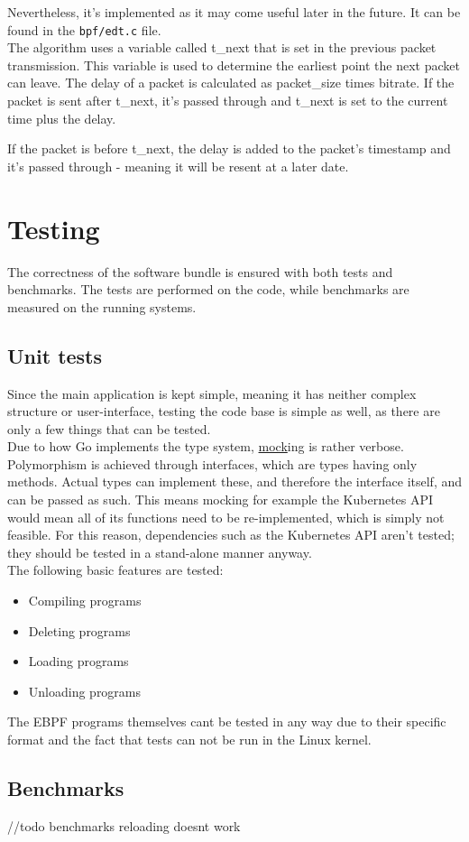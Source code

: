 Nevertheless, it's implemented as it may come useful later in the future. It can be found in the \texttt{bpf/edt.c} file. \\

The algorithm uses a variable called t\_next that is set in the previous packet transmission. This variable is used to determine the earliest point the next packet can leave. The delay of a packet is calculated as packet\_size times bitrate. If the packet is sent after t\_next, it's passed through and t\_next is set to the current time plus the delay.

If the packet is before t\_next, the delay is added to the packet's timestamp and it's passed through - meaning it will be resent at a later date.

\newpage
\section{Testing}
The correctness of the software bundle is ensured with both tests and benchmarks. The tests are performed on the code, while benchmarks are measured on the running systems.

\subsection{Unit tests}
Since the main application is kept simple, meaning it has neither complex structure or user-interface, testing the code base is simple as well, as there are only a few things that can be tested. \\

Due to how Go implements the type system, \underline{\gls{mock}}ing is rather verbose. Polymorphism is achieved through interfaces, which are types having only methods. Actual types can implement these, and therefore the interface itself, and can be passed as such. This means mocking for example the Kubernetes API would mean all of its functions need to be re-implemented, which is simply not feasible. For this reason, dependencies such as the Kubernetes API aren't tested; they should be tested in a stand-alone manner anyway. \\

\noindent
The following basic features are tested:
\begin{itemize}
	\item Compiling programs
	\item Deleting programs
	\item Loading programs
	\item Unloading programs
\end{itemize}

The EBPF programs themselves cant be tested in any way due to their specific format and the fact that tests can not be run in the Linux kernel.

\newpage
\subsection{Benchmarks}


//todo
benchmarks
reloading doesnt work